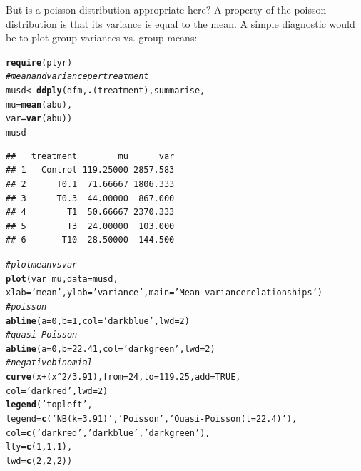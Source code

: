 \documentclass{scrartcl}\usepackage[]{graphicx}\usepackage[]{color}
\makeatletter
\newcommand{\hlnum}[1]{\textcolor[rgb]{0.686,0.059,0.569}{#1}}%
\newcommand{\hlstr}[1]{\textcolor[rgb]{0.192,0.494,0.8}{#1}}%
\newcommand{\hlcom}[1]{\textcolor[rgb]{0.678,0.584,0.686}{\textit{#1}}}%
\newcommand{\hlopt}[1]{\textcolor[rgb]{0,0,0}{#1}}%
\newcommand{\hlstd}[1]{\textcolor[rgb]{0.345,0.345,0.345}{#1}}%
\newcommand{\hlkwb}[1]{\textcolor[rgb]{0.69,0.353,0.396}{#1}}%
\newcommand{\hlkwc}[1]{\textcolor[rgb]{0.333,0.667,0.333}{#1}}%
\newcommand{\hlkwd}[1]{\textcolor[rgb]{0.737,0.353,0.396}{\textbf{#1}}}%
\newenvironment{kframe}{%
 \def\at@end@of@kframe{}%
 \ifinner\ifhmode%
  \def\at@end@of@kframe{\end{minipage}}%
  \begin{minipage}{\columnwidth}%
 \fi\fi%
 \def\FrameCommand##1{\hskip\@totalleftmargin \hskip-\fboxsep
 \colorbox{shadecolor}{##1}\hskip-\fboxsep
     \hskip-\linewidth \hskip-\@totalleftmargin \hskip\columnwidth}%
 \MakeFramed {\advance\hsize-\width
   \@totalleftmargin\z@ \linewidth\hsize
   \@setminipage}}%
 {\par\unskip\endMakeFramed%
 \at@end@of@kframe}
\newenvironment{knitrout}{}{} %
\renewenvironment{knitrout}{\begin{spacing}{1}}{\end{spacing}}
\makeatother
\begin{document}
But is a poisson distribution appropriate here? 
A property of the poisson distribution is that its variance is equal to the mean. 
A simple diagnostic would be to plot group variances vs. group means:

\begin{knitrout}
\color{fgcolor}\begin{kframe}
\begin{alltt}
\hlkwd{require}\hlstd{(plyr)}
\hlcom{# mean and variance per treatment}
\hlstd{musd} \hlkwb{<-} \hlkwd{ddply}\hlstd{(dfm,} \hlkwd{.}\hlstd{(treatment), summarise,}
              \hlkwc{mu} \hlstd{=} \hlkwd{mean}\hlstd{(abu),}
              \hlkwc{var} \hlstd{=} \hlkwd{var}\hlstd{(abu))}
\hlstd{musd}
\end{alltt}
\begin{verbatim}
##   treatment        mu      var
## 1   Control 119.25000 2857.583
## 2      T0.1  71.66667 1806.333
## 3      T0.3  44.00000  867.000
## 4        T1  50.66667 2370.333
## 5        T3  24.00000  103.000
## 6       T10  28.50000  144.500
\end{verbatim}
\begin{alltt}
\hlcom{# plot mean vs var}
\hlkwd{plot}\hlstd{(var} \hlopt{~} \hlstd{mu,} \hlkwc{data} \hlstd{= musd,}
     \hlkwc{xlab} \hlstd{=} \hlstr{'mean'}\hlstd{,} \hlkwc{ylab} \hlstd{=} \hlstr{'variance'}\hlstd{,} \hlkwc{main} \hlstd{=} \hlstr{'Mean-variance relationships'}\hlstd{)}
\hlcom{# poisson}
\hlkwd{abline}\hlstd{(}\hlkwc{a} \hlstd{=} \hlnum{0}\hlstd{,} \hlkwc{b} \hlstd{=} \hlnum{1}\hlstd{,} \hlkwc{col} \hlstd{=} \hlstr{'darkblue'}\hlstd{,} \hlkwc{lwd} \hlstd{=} \hlnum{2}\hlstd{)}
\hlcom{# quasi-Poisson}
\hlkwd{abline}\hlstd{(}\hlkwc{a} \hlstd{=} \hlnum{0}\hlstd{,} \hlkwc{b} \hlstd{=} \hlnum{22.41}\hlstd{,} \hlkwc{col} \hlstd{=} \hlstr{'darkgreen'}\hlstd{,} \hlkwc{lwd} \hlstd{=} \hlnum{2}\hlstd{)}
\hlcom{# negative binomial}
\hlkwd{curve}\hlstd{(x} \hlopt{+} \hlstd{(x}\hlopt{^}\hlnum{2} \hlopt{/} \hlnum{3.91}\hlstd{),} \hlkwc{from} \hlstd{=} \hlnum{24}\hlstd{,} \hlkwc{to} \hlstd{=} \hlnum{119.25}\hlstd{,} \hlkwc{add} \hlstd{=} \hlnum{TRUE}\hlstd{,}
      \hlkwc{col} \hlstd{=} \hlstr{'darkred'}\hlstd{,} \hlkwc{lwd} \hlstd{=} \hlnum{2}\hlstd{)}
\hlkwd{legend}\hlstd{(}\hlstr{'topleft'}\hlstd{,}
       \hlkwc{legend} \hlstd{=} \hlkwd{c}\hlstd{(}\hlstr{'NB(k = 3.91)'}\hlstd{,} \hlstr{'Poisson'}\hlstd{,} \hlstr{'Quasi-Poisson(t = 22.4)'}\hlstd{),}
       \hlkwc{col} \hlstd{=} \hlkwd{c}\hlstd{(}\hlstr{'darkred'}\hlstd{,} \hlstr{'darkblue'}\hlstd{,} \hlstr{'darkgreen'}\hlstd{),}
       \hlkwc{lty} \hlstd{=} \hlkwd{c}\hlstd{(}\hlnum{1}\hlstd{,}\hlnum{1}\hlstd{,} \hlnum{1}\hlstd{),}
       \hlkwc{lwd} \hlstd{=} \hlkwd{c}\hlstd{(}\hlnum{2}\hlstd{,}\hlnum{2}\hlstd{,} \hlnum{2}\hlstd{))}
\end{alltt}
\end{kframe}


\end{knitrout}
\end{document}
